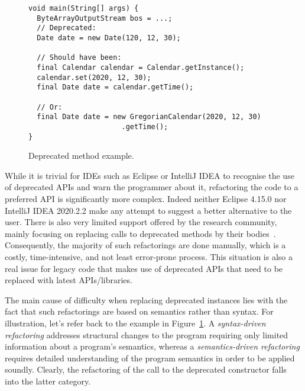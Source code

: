 \documentclass[runningheads,a4paper]{llncs}
\begin{document}
\begin{figure}
\begin{lstlisting}[mathescape=true,showstringspaces=false]
void main(String[] args) {
  ByteArrayOutputStream bos = ...;
  // Deprecated:
  Date date = new Date(120, 12, 30);
 
  // Should have been:
  final Calendar calendar = Calendar.getInstance();
  calendar.set(2020, 12, 30);
  final Date date = calendar.getTime();

  // Or:
  final Date date = new GregorianCalendar(2020, 12, 30)
                      .getTime();
}
\end{lstlisting}
\caption{Deprecated method example.}
\label{ex:deprecated-method}
\end{figure}


While it is trivial for IDEs such as Eclipse or IntelliJ IDEA to
recognise the use of deprecated APIs and warn the programmer about it,
refactoring the code to a preferred API is significantly more
complex. Indeed neither Eclipse 4.15.0 nor IntelliJ IDEA 2020.2.2 make
any attempt to suggest a better alternative to the user. There is also
very limited support offered by the research community, mainly
focusing on replacing calls to deprecated methods by their
bodies~\cite{DBLP:conf/paste/Perkins05}. Consequently, the majority of
such refactorings are done manually, which is a costly,
time-intensive, and not least error-prone process.  This situation is
also a real issue for legacy code that makes use of deprecated APIs
that need to be replaced with latest APIs/libraries.

The main cause of difficulty when replacing deprecated instances lies
with the fact that such refactorings are based on semantics rather
than syntax. For illustration, let's refer back to the example in
Figure~\ref{ex:deprecated-method}.  A {\em syntax-driven refactoring}
addresses structural changes to the program requiring only limited
information about a program's semantics, whereas a {\em
  semantics-driven refactoring} requires detailed understanding of the
program semantics in order to be applied soundly.  Clearly, the
refactoring of the call to the deprecated  constructor
falls into the latter category. %

\end{document}
